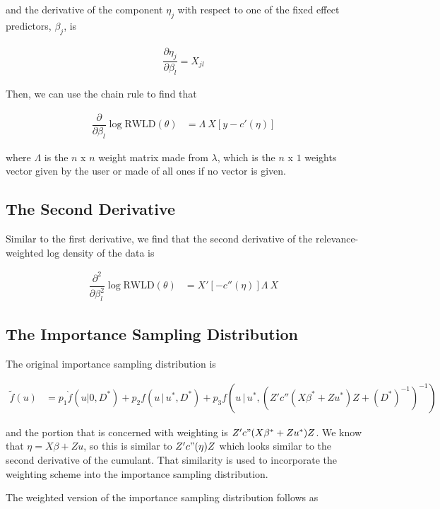 \documentclass{article}
\begin{document}
\noindent and the derivative of the component $\eta_j$ with respect to one of the fixed effect predictors, $\beta_j$, is 

\begin{align}
\dfrac{\partial \eta_j}{\partial \beta_l} = X_{jl}
\end{align}

\noindent Then, we can use the chain rule to find that

\begin{align}
\dfrac{\partial}{\partial \beta_l} \log \text{RWLD}(\theta) &= \Lambda \ X \left[ y- c'(\eta) \right]
\end{align}

\noindent where $\Lambda$ is the $n$ x $n$ weight matrix made from $\lambda$, which is the $n$ x $1$ weights vector given by the user or made of all ones if no vector is given. 

\subsection{The Second Derivative}

Similar to the first derivative, we find that the second derivative of the relevance-weighted log density of the data is 

\begin{align}
\dfrac{\partial^2}{\partial \beta_l^2} \log \text{RWLD}(\theta) &= X' \left[- c''(\eta) \right] \Lambda \ X
\end{align}

\subsection{The Importance Sampling Distribution}

The original importance sampling distribution is 

\begin{align}
\tilde{f}(u) &= p_1  \grave{f}(u|0,D^*)+p_2  f(u \, | \, u^*, D^*)+p_3  f(u \, | \, u^*, (Z'  c''(X \beta^*+Zu^*) Z +(D^*)^{-1}   )^{-1})
\end{align}

\noindent and the portion that is concerned with weighting is $Z' c"(X \beta^* + Zu^*) Z$. We know that $\eta = X \beta + Zu$, so this is similar to $Z' c"(\eta) Z$ which looks similar to the second derivative of the cumulant. That similarity is used to incorporate the weighting scheme into the importance sampling distribution. 

The weighted version of the importance sampling distribution follows as
\end{document}
